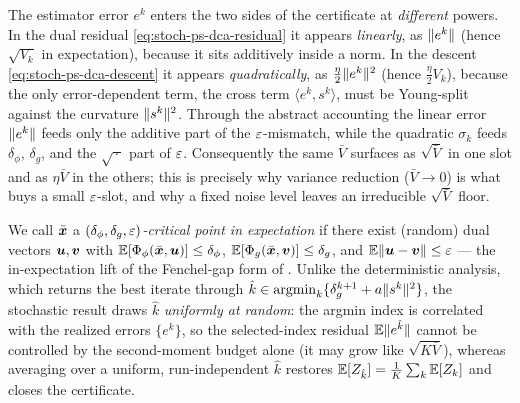 \begin{remark}
\label{rem:two-power}
The estimator error $e^k$ enters the two sides of the certificate at
\emph{different} powers. In the dual residual
\eqref{eq:stoch-ps-dca-residual} it appears \emph{linearly}, as
$\lVert e^k\rVert$ (hence $\sqrt{V_k}$ in expectation), because it sits
additively inside a norm. In the descent
\eqref{eq:stoch-ps-dca-descent} it appears \emph{quadratically}, as
$\tfrac\eta2\lVert e^k\rVert^2$ (hence $\tfrac\eta2 V_k$), because the only
error-dependent term, the cross term $\langle e^k,s^k\rangle$, must be
Young-split against the curvature $\lVert s^k\rVert^2$. Through the abstract
accounting the linear error $\lVert e^k\rVert$ feeds only the additive part of the
$\varepsilon$-mismatch, while the quadratic $\sigma_k$ feeds
$\delta_\phi$, $\delta_g$, and the $\sqrt{\,\cdot\,}$ part of $\varepsilon$.
Consequently the same $\bar V$ surfaces as $\sqrt{\bar V}$ in one slot
and as $\eta\bar V$ in the others; this is precisely why variance
reduction ($\bar V\to0$) is what buys a small $\varepsilon$-slot, and why a
fixed noise level leaves an irreducible $\sqrt{\bar V}$ floor.
\end{remark}

We call $\bar{\bm{x}}$ a \emph{$(\delta_\phi,\delta_g,\varepsilon)$-critical point in
expectation} if there exist (random) dual vectors $\bm{u},\bm{v}$ with
$\mathbb{E}[\Phi_\phi(\bar{\bm{x}},\bm{u})]\le\delta_\phi$,
$\mathbb{E}[\Phi_g(\bar{\bm{x}},\bm{v})]\le\delta_g$, and
$\mathbb{E}\lVert \bm{u}-\bm{v}\rVert\le\varepsilon$ --- the in-expectation lift of the
Fenchel-gap form of . Unlike the
deterministic analysis, which returns the best iterate through
$\hat k\in\operatorname*{\mathrm{argmin}}_k\{\delta_g^{k+1}+a\lVert s^k\rVert^2\}$, the stochastic
result draws $\hat k$ \emph{uniformly at random}: the argmin index is
correlated with the realized errors $\{e^k\}$, so the selected-index
residual $\mathbb{E}\lVert e^{\hat k}\rVert$ cannot be controlled by the
second-moment budget alone (it may grow like $\sqrt{K\bar V}$), whereas
averaging over a uniform, run-independent $\hat k$ restores
$\mathbb{E}[Z_{\hat k}]=\tfrac1K\sum_k\mathbb{E}[Z_k]$ and closes the certificate.

